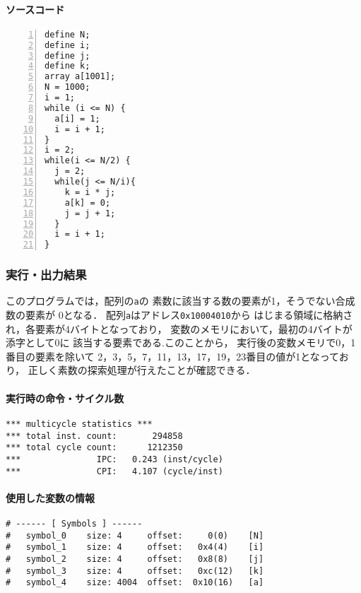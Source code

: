 \paragraph*{ソースコード}

\begin{Verbatim}[numbers=left, xleftmargin=10mm, numbersep=6pt, frame=single,
  fontsize=\small, baselinestretch=0.8]
define N;
define i;
define j;
define k;
array a[1001];
N = 1000;
i = 1;
while (i <= N) {
  a[i] = 1;
  i = i + 1;
}
i = 2;
while(i <= N/2) {
  j = 2;
  while(j <= N/i){
    k = i * j;
    a[k] = 0;
    j = j + 1;
  }
  i = i + 1;
}
\end{Verbatim}

\subsubsection{実行・出力結果}
このプログラムでは，配列の\verb|a|の
素数に該当する数の要素が1，そうでない合成数の要素が
0となる．
配列\verb|a|はアドレス\verb|0x10004010|から
はじまる領域に格納され，各要素が4バイトとなっており，
変数のメモリにおいて，最初の4バイトが添字として0に
該当する要素である.このことから，
実行後の変数メモリで0，1番目の要素を除いて
2，3，5，7，11，13，17，19，23番目の値が1となっており，
正しく素数の探索処理が行えたことが確認できる．

\paragraph*{実行時の命令・サイクル数}
\begin{Verbatim}[numbers=none, frame=single,
fontsize=\small, baselinestretch=0.8]
*** multicycle statistics ***
*** total inst. count:       294858
*** total cycle count:      1212350
***               IPC:   0.243 (inst/cycle)
***               CPI:   4.107 (cycle/inst)
\end{Verbatim}

\paragraph*{使用した変数の情報}
\begin{Verbatim}[numbers=none, frame=single,
  fontsize=\small, baselinestretch=0.8]
# ------ [ Symbols ] ------
# 	symbol_0 	size: 4 	offset:     0(0) 	[N]
# 	symbol_1 	size: 4 	offset:   0x4(4) 	[i]
# 	symbol_2 	size: 4 	offset:   0x8(8) 	[j]
# 	symbol_3 	size: 4 	offset:   0xc(12) 	[k]
# 	symbol_4 	size: 4004 	offset:  0x10(16) 	[a]  
\end{Verbatim}

